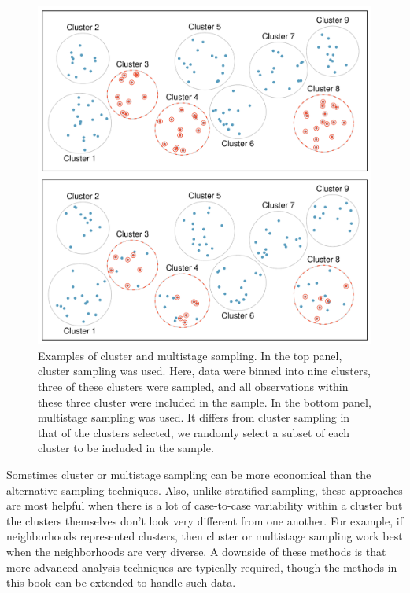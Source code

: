 \begin{figure}
\centering
\includegraphics[width=\textwidth]{ch_intro_to_data/figures/samplingMethodsFigure/cluster_multistage}
\caption{Examples of cluster and multistage sampling. In the top panel, cluster sampling was used. Here, data were binned into nine clusters, three of these clusters were sampled, and all observations within these three cluster were included in the sample. In the bottom panel, multistage sampling was used.
It differs from cluster sampling in that of the clusters selected, we randomly select a subset of each cluster to be included in the sample.}
\label{cluster_multistage}
\end{figure}

Sometimes cluster or multistage sampling can be more economical than the alternative sampling techniques. Also, unlike stratified sampling, these approaches are most helpful when there is a lot of case-to-case variability within a cluster but the clusters themselves don't look very different from one another. For example, if neighborhoods represented clusters, then cluster or multistage sampling work best when the neighborhoods are very diverse. A downside of these methods is that more advanced analysis techniques are typically required, though the methods in this book can be extended to handle such data.

